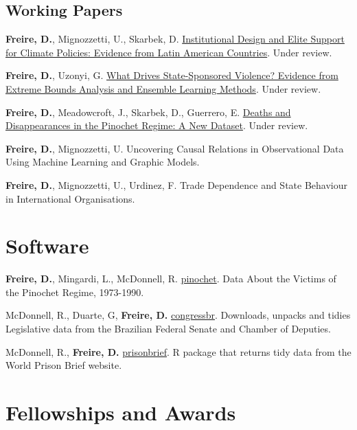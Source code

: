 \documentclass[a4paper]{article}
\renewenvironment{itemize}{
  \begin{list}{}{
    \setlength{\leftmargin}{1.5em}
  }
}{
  \end{list}
}
\begin{document}
\subsection*{Working Papers}

\begin{itemize}
	\item \textbf{Freire, D.}, Mignozzetti, U., Skarbek, D. \href{https://github.com/danilofreire/climate-governance}{Institutional Design and Elite Support for Climate Policies: Evidence from Latin American Countries}. Under review.
    \item \textbf{Freire, D.}, Uzonyi, G. \href{https://osf.io/pzx3q}{What Drives State-Sponsored Violence? Evidence from Extreme Bounds Analysis and Ensemble Learning Methods}. Under review.
    \item \textbf{Freire, D.}, Meadowcroft, J., Skarbek, D., Guerrero, E.  \href{https://github.com/danilofreire/pinochet}{Deaths and Disappearances in the Pinochet Regime: A New Dataset}. Under review. 
		\item \textbf{Freire, D.}, Mignozzetti, U. Uncovering Causal Relations in Observational Data Using Machine Learning and Graphic Models.
	\item \textbf{Freire, D.}, Mignozzetti, U., Urdinez, F. Trade Dependence and State Behaviour in International Organisations. 
\end{itemize}

\section*{Software}

\begin{itemize}
	\item \textbf{Freire, D.}, Mingardi, L., McDonnell, R. \href{https://cran.r-project.org/package=pinochet}{pinochet}. Data About the Victims of the Pinochet Regime, 1973-1990.
	\item McDonnell, R., Duarte, G, \textbf{Freire, D.} \href{https://cran.r-project.org/package=congressbr}{congressbr}. Downloads, unpacks and tidies Legislative data from the Brazilian Federal Senate and Chamber of Deputies.
	\item McDonnell, R., \textbf{Freire, D.} \href{http://danilofreire.github.io/prisonbrief/}{prisonbrief}. R package that returns tidy data from the World Prison Brief website. 
\end{itemize}

\section*{Fellowships and Awards}
\end{document}
